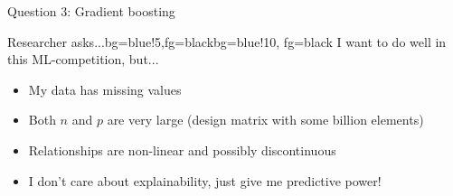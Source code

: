 \begin{frame}{Question 3: Gradient boosting}
	
	
	\begin{myblock}{Researcher asks...}{bg=blue!5,fg=black}{bg=blue!10, fg=black}
		I want to do well in this ML-competition, but...
		\begin{itemize}
			\item<2-> My data has missing values
			\item<2-> Both $n$ and $p$ are very large (design matrix with some billion elements)
			\item<2-> Relationships are non-linear and possibly discontinuous
			\item<2-> I don't care about explainability, just give me predictive power!
		\end{itemize}
	\end{myblock}

\end{frame}

